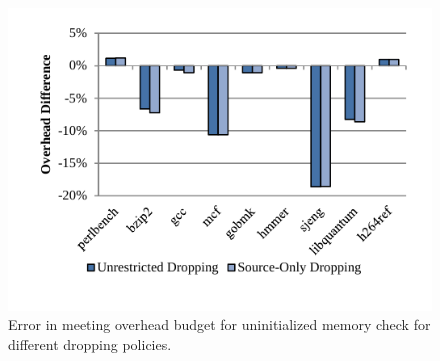 \begin{figure}
  \begin{center}
    \includegraphics[width=\columnwidth]{figs/data_umc_exec_time.pdf}
    \vspace{-0.2in}
    \caption{Error in meeting overhead budget for uninitialized memory check for different dropping policies.}
    \label{fig:evaluation.umc_exec_time}
    \vspace{-0.2in}
  \end{center}
\end{figure}

